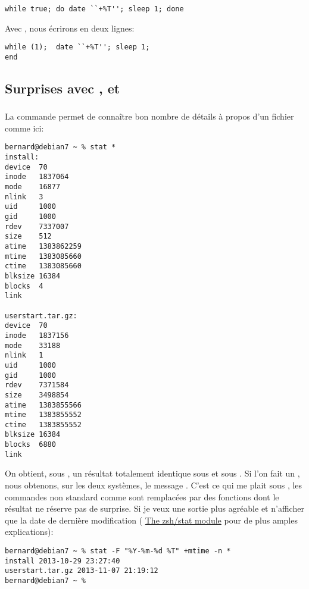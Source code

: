 \begin{lstlisting}
while true; do date ``+%T''; sleep 1; done
\end{lstlisting}

Avec \tcsh{}, nous écrirons en deux lignes:
\begin{lstlisting}
while (1);  date ``+%T''; sleep 1;
end
\end{lstlisting}

\subsection{Surprises avec ,  et }

\subsubsection{}
La commande  permet de connaître bon nombre de détails à propos d'un fichier comme ici:

\begin{lstlisting}
bernard@debian7 ~ % stat *
install:
device  70
inode   1837064
mode    16877
nlink   3
uid     1000
gid     1000
rdev    7337007
size    512
atime   1383862259
mtime   1383085660
ctime   1383085660
blksize 16384
blocks  4
link

userstart.tar.gz:
device  70
inode   1837156
mode    33188
nlink   1
uid     1000
gid     1000
rdev    7371584
size    3498854
atime   1383855566
mtime   1383855552
ctime   1383855552
blksize 16384
blocks  6880
link
\end{lstlisting}

On obtient, sous \zsh{}, un résultat totalement identique sous \netbsd{} et sous \linux{}.  Si l'on fait un , nous obtenons, sur les deux systèmes, le message . C'est ce qui me plait sous \zsh{}, les commandes non standard comme  sont remplacées par des fonctions dont le résultat ne réserve pas de surprise.  Si je veux une sortie plus agréable et n'afficher que la date de dernière modification (\cf{} \href{http://zsh.sourceforge.net/Doc/Release/Zsh-Modules.html#The-zsh_002fstat-Module}{The zsh/stat module} pour de plus amples explications):

\begin{lstlisting}
bernard@debian7 ~ % stat -F "%Y-%m-%d %T" +mtime -n *
install 2013-10-29 23:27:40
userstart.tar.gz 2013-11-07 21:19:12
bernard@debian7 ~ %
\end{lstlisting}

